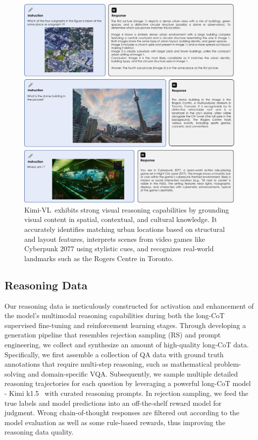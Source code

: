 \documentclass{article}
\newcommand{\ourname}{{Kimi-VL}}
\newcommand{\hy}[2]{\textcolor{#1}{haoyu:#2}}
\newcommand{\citep}[1]{\parencite{#1}}
\begin{document}
\begin{figure}[t]
    \centering
    \includegraphics[width=0.8\linewidth]{figures/case_general.pdf}
    \caption{\ourname~exhibits strong visual reasoning capabilities by grounding visual content in spatial, contextual, and cultural knowledge. It accurately identifies matching urban locations based on structural and layout features, interprets scenes from video games like Cyberpunk 2077 using stylistic cues, and recognizes real-world landmarks such as the Rogers Centre in Toronto. }\label{fig:outline}
\end{figure}


\subsection{Reasoning Data}
Our reasoning data is meticulously constructed for activation and enhancement of the model's multimodal reasoning capabilities during both the long-CoT supervised fine-tuning and reinforcement learning stages.
Through developing a generation pipeline that resembles rejection sampling (RS) and prompt engineering, we collect and synthesize an amount of high-quality long-CoT data.
Specifically, we first assemble a collection of QA data with ground truth annotations that require multi-step reasoning, such as mathematical problem-solving and domain-specific VQA.
Subsequently, we sample multiple detailed reasoning trajectories for each question by leveraging a powerful long-CoT model - Kimi k1.5~\citep{team2025kimi} with curated reasoning prompts.
In rejection sampling, we feed the true labels and model predictions into an off-the-shelf reward model for judgment.
Wrong chain-of-thought responses are filtered out according to the model evaluation as well as some rule-based rewards, thus improving the reasoning data quality.
\end{document}
